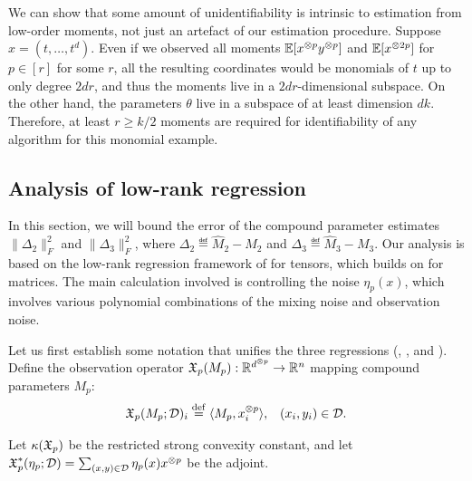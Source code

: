 We can show that some amount of unidentifiability is intrinsic to
estimation from low-order moments, not just an artefact of our
estimation procedure.  Suppose $x = (t, \dots, t^d)$.  Even if we
observed all moments $\operatorname{\mathbb{E}}[x^{\otimes p}y^{\otimes p}]$ and $\operatorname{\mathbb{E}}[x^{\otimes 2p}]$ for $p \in
[r]$ for some $r$, all the resulting coordinates would be monomials of $t$ up to only degree
$2dr$, and thus the moments live in a $2dr$-dimensional subspace.  On
the other hand, the parameters $\theta$ live in a subspace of at least
dimension $dk$.  Therefore, at least $r \ge k/2$ moments are required
for identifiability of any algorithm for this monomial example.

\subsection{Analysis of low-rank regression}
\label{sec:regression}

In this section, we will bound the error of
the compound parameter estimates $\|\Delta_2\|_F^2$ and $\|\Delta_3\|_F^2$,
where $\Delta_2 \eqdef \hat M_2 - M_2$
and $\Delta_3 \eqdef \hat M_3 - M_3$.
Our analysis is based on the low-rank regression framework of
\citet{Tomioka2011} for tensors, which builds on
\citet{NegahbanWainwright2009} for matrices.
The main calculation involved is controlling the noise $\eta_p(x)$,
which involves various polynomial combinations of the mixing noise and observation noise.

Let us first establish some notation that unifies the three regressions (, , and ).
Define the observation operator $\operatorname{\mathfrak{X}}_p(M_p) : \mathbb{R}^{d^{\otimes p}} \to \mathbb{R}^{n}$
mapping compound parameters $M_p$:
\begin{align}
\operatorname{\mathfrak{X}}_p(M_p; \mathcal{D})_i &\stackrel{\rm def}{=} \langle M_p, x^{\otimes p}_i \rangle, & (x_i, y_i) \in \mathcal{D}.
\end{align}

Let $\kappa(\operatorname{\mathfrak{X}}_p)$ be the restricted strong convexity constant,
and let $\operatorname{\mathfrak{X}}^*_p(\eta_p; \mathcal{D}) = \sum_{(x,y) \in \mathcal{D}} \eta_p(x) x^{\otimes p}$
be the adjoint.




